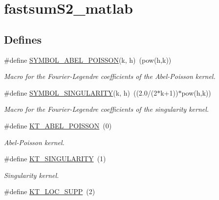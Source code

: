 \hypertarget{group__applications__fastsumS2__test}{
\section{fastsum\-S2\_\-matlab}
\label{group__applications__fastsumS2__test}
}
\subsection*{Defines}
\begin{CompactItemize}
\item 
\hypertarget{group__applications__fastsumS2__test_ga6}{
\#define \hyperlink{group__applications__fastsumS2__test_ga6}{SYMBOL\_\-ABEL\_\-POISSON}(k, h)~(pow(h,k))}
\label{group__applications__fastsumS2__test_ga6}

\begin{CompactList}\small\item\em Macro for the Fourier-Legendre coefficients of the Abel-Poisson kernel. \item\end{CompactList}\item 
\hypertarget{group__applications__fastsumS2__test_ga7}{
\#define \hyperlink{group__applications__fastsumS2__test_ga7}{SYMBOL\_\-SINGULARITY}(k, h)~((2.0/(2$\ast$k+1))$\ast$pow(h,k))}
\label{group__applications__fastsumS2__test_ga7}

\begin{CompactList}\small\item\em Macro for the Fourier-Legendre coefficients of the singularity kernel. \item\end{CompactList}\item 
\hypertarget{group__applications__fastsumS2__test_ga8}{
\#define \hyperlink{group__applications__fastsumS2__test_ga8}{KT\_\-ABEL\_\-POISSON}~(0)}
\label{group__applications__fastsumS2__test_ga8}

\begin{CompactList}\small\item\em Abel-Poisson kernel. \item\end{CompactList}\item 
\hypertarget{group__applications__fastsumS2__test_ga9}{
\#define \hyperlink{group__applications__fastsumS2__test_ga9}{KT\_\-SINGULARITY}~(1)}
\label{group__applications__fastsumS2__test_ga9}

\begin{CompactList}\small\item\em Singularity kernel. \item\end{CompactList}\item 
\hypertarget{group__applications__fastsumS2__test_ga10}{
\#define \hyperlink{group__applications__fastsumS2__test_ga10}{KT\_\-LOC\_\-SUPP}~(2)}
\label{group__applications__fastsumS2__test_ga10}


\end{CompactItemize}
